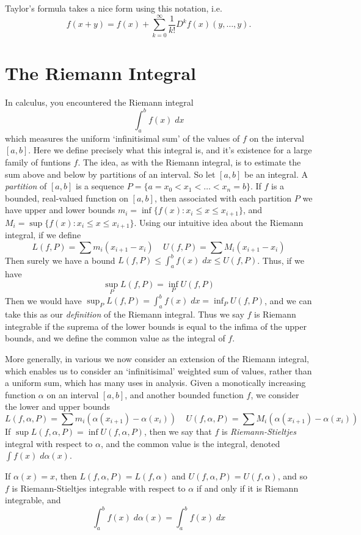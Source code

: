Taylor's formula takes a nice form using this notation, i.e.
%
\[ f(x + y) = f(x) + \sum_{k = 0}^\infty \frac{1}{k!} D^k f(x)(y,\dots,y). \]



\chapter{The Riemann Integral}

In calculus, you encountered the Riemann integral
%
\[ \int_a^b f(x)\; dx \]
%
which measures the uniform `infinitisimal sum' of the values of $f$ on the interval $[a,b]$. Here we define precisely what this integral is, and it's existence for a large family of funtions $f$. The idea, as with the Riemann integral, is to estimate the sum above and below by partitions of an interval. So let $[a,b]$ be an integral. A {\it partition} of $[a,b]$ is a sequence $P = \{ a = x_0 < x_1 < \dots < x_n = b \}$. If $f$ is a bounded, real-valued function on $[a,b]$, then associated with each partition $P$ we have upper and lower bounds $m_i = \inf \{ f(x): x_i \leq x \leq x_{i+1} \}$, and $M_i = \sup \{ f(x): x_i \leq x \leq x_{i+1} \}$. Using our intuitive idea about the Riemann integral, if we define
%
\[ L(f,P) = \sum m_i (x_{i+1} - x_i)\ \ \ \ \ U(f,P) = \sum M_i (x_{i+1} - x_i) \]
%
Then surely we have a bound $L(f,P) \leq \int_a^b f(x)\; dx \leq U(f,P)$. Thus, if we have
%
\[ \sup_P L(f,P) = \inf_P U(f,P) \]
%
Then we would have $\sup_P L(f,P) = \int_a^b f(x)\; dx = \inf_P U(f,P)$, and we can take this as our {\it definition} of the Riemann integral. Thus we say $f$ is Riemann integrable if the suprema of the lower bounds is equal to the infima of the upper bounds, and we define the common value as the integral of $f$.

More generally, in various we now consider an extension of the Riemann integral, which enables us to consider an `infinitisimal' weighted sum of values, rather than a uniform sum, which has many uses in analysis. Given a monotically increasing function $\alpha$ on an interval $[a,b]$, and another bounded function $f$, we consider the lower and upper bounds
%
\[ L(f,\alpha,P) = \sum m_i (\alpha(x_{i+1}) - \alpha(x_i))\ \ \ \ \ U(f,\alpha,P) = \sum M_i(\alpha(x_{i+1}) - \alpha(x_i)) \]
%
If $\sup L(f,\alpha,P) = \inf U(f,\alpha,P)$, then we say that $f$ is {\it Riemann-Stieltjes} integral with respect to $\alpha$, and the common value is the integral, denoted $\int f(x)\; d\alpha(x)$.

\begin{example}
    If $\alpha(x) = x$, then $L(f,\alpha,P) = L(f,\alpha)$ and $U(f,\alpha,P) = U(f,\alpha)$, and so $f$ is Riemann-Stieltjes integrable with respect to $\alpha$ if and only if it is Riemann integrable, and
    \[ \int_a^b f(x)\; d\alpha(x) = \int_a^b f(x)\; dx \]
\end{example}

